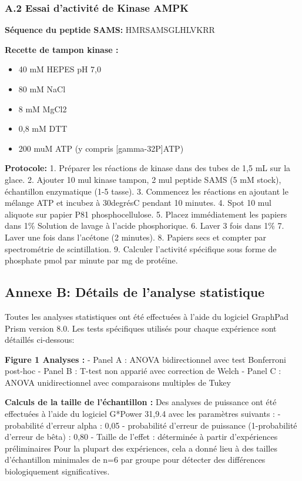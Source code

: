 \documentclass[11pt,a4paper]{article}
\begin{document}
\subsubsection*{A.2 Essai d'activité de Kinase AMPK}

\textbf{Séquence du peptide SAMS:} HMRSAMSGLHLVKRR

\textbf{Recette de tampon kinase :}
\begin{itemize}
\item 40 mM HEPES pH 7,0
\item 80 mM NaCl
\item 8 mM MgCl2
\item 0,8 mM DTT
\item 200 muM ATP (y compris [gamma-32P]ATP)
\end{itemize}

\textbf{Protocole:}
1. Préparer les réactions de kinase dans des tubes de 1,5 mL sur la glace. 2. Ajouter 10 mul kinase tampon, 2 mul peptide SAMS (5 mM stock), échantillon enzymatique (1-5 tasse). 3. Commencez les réactions en ajoutant le mélange ATP et incubez à 30degrésC pendant 10 minutes. 4. Spot 10 mul aliquote sur papier P81 phosphocellulose. 5. Placez immédiatement les papiers dans 1\% Solution de lavage à l'acide phosphorique. 6. Laver 3 fois dans 1\% 7. Laver une fois dans l'acétone (2 minutes). 8. Papiers secs et compter par spectrométrie de scintillation. 9. Calculer l'activité spécifique sous forme de phosphate pmol par minute par mg de protéine.

\subsection*{Annexe B: Détails de l'analyse statistique}

Toutes les analyses statistiques ont été effectuées à l'aide du logiciel GraphPad Prism version 8.0. Les tests spécifiques utilisés pour chaque expérience sont détaillés ci-dessous:

\textbf{Figure 1 Analyses :}
- Panel A : ANOVA bidirectionnel avec test Bonferroni post-hoc - Panel B : T-test non apparié avec correction de Welch - Panel C : ANOVA unidirectionnel avec comparaisons multiples de Tukey

\textbf{Calculs de la taille de l'échantillon :}
Des analyses de puissance ont été effectuées à l'aide du logiciel G*Power 31,9.4 avec les paramètres suivants : - probabilité d'erreur alpha : 0,05 - probabilité d'erreur de puissance (1-probabilité d'erreur de bêta) : 0,80 - Taille de l'effet : déterminée à partir d'expériences préliminaires Pour la plupart des expériences, cela a donné lieu à des tailles d'échantillon minimales de n=6 par groupe pour détecter des différences biologiquement significatives.
\end{document}
